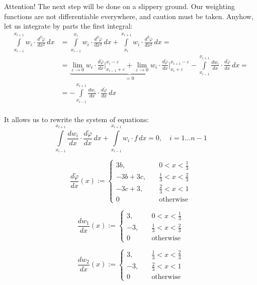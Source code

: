 \documentclass[notitlepage]{report}
\begin{document}
Attention! The next step will be done on a slippery ground.
Our weighting functions are not differentiable everywhere, and caution must be taken.
Anyhow, let us integrate by parts the first integral:
\begin{align*}
\int\limits_{x_{i-1}}^{x_{i+1}} w_i \cdot \frac{d^2\tilde{\varphi}}{dx^2}\,dx &= 
\int\limits_{x_{i-1}}^{x_{i}} w_i \cdot \frac{d^2\tilde{\varphi}}{dx^2}\,dx + 
\int\limits_{x_{i}}^{x_{i+1}} w_i \cdot \frac{d^2\tilde{\varphi}}{dx^2}\,dx = \\
& =\underbrace{\lim\limits_{\varepsilon\rightarrow 0}w_i\cdot \frac{d\tilde{\varphi}}{dx}\Big|_{x_{i-1}+\varepsilon}^{x_{i}-\varepsilon} +
\lim\limits_{\varepsilon\rightarrow 0}w_i\cdot \frac{d\tilde{\varphi}}{dx}\Big|_{x_{i}+\varepsilon}^{x_{i+1}-\varepsilon}}_{= 0} - \int\limits_{x_{i-1}}^{x_{i+1}} \frac{dw_i}{dx}\cdot \frac{d\tilde{\varphi}}{dx}\,dx  = \\
& = - \int\limits_{x_{i-1}}^{x_{i+1}} \frac{dw_i}{dx}\cdot \frac{d\tilde{\varphi}}{dx}\,dx \\
\end{align*}

It allows us to rewrite the system of equations:
\begin{equation}
\label{eq:galerkin:system}
\int\limits_{x_{i-1}}^{x_{i+1}} \frac{dw_i}{dx} \cdot \frac{d\tilde{\varphi}}{dx}\,dx + \int\limits_{x_{i-1}}^{x_{i+1}} w_i\cdot f\,dx = 0, \quad i = 1\dots n-1
\end{equation}

$$
\frac{d\tilde{\varphi}}{dx} (x) := \left\{
\begin{split}
3b, & \quad 0 < x < \frac{1}{3}\\
-3b+3c, & \quad \frac{1}{3} < x < \frac{2}{3}\\
-3c+3, & \quad \frac{2}{3} < x < 1\\
0 & \quad \text{otherwise}
\end{split}
\right.
$$

$$
\frac{dw_1}{dx} (x) := \left\{
\begin{split}
3, & \quad 0 < x < \frac{1}{3}\\
-3, & \quad \frac{1}{3} < x < \frac{2}{3}\\
0 & \quad \text{otherwise}
\end{split}
\right.
$$

$$
\frac{dw_2}{dx} (x) := \left\{
\begin{split}
3, & \quad \frac{1}{3} < x < \frac{2}{3}\\
-3, & \quad \frac{2}{3} < x < 1\\
0 & \quad \text{otherwise}
\end{split}
\right.
$$
\end{document}
